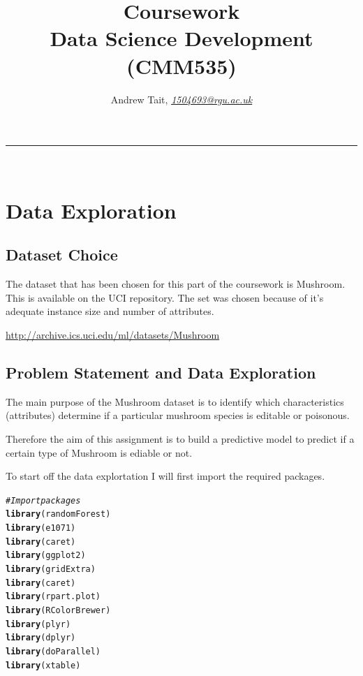 \documentclass[10pt  ,usenames, dvipsnames]{article}\usepackage[]{graphicx}\usepackage[]{color}
\makeatletter
\newcommand{\hlcom}[1]{\textcolor[rgb]{0.678,0.584,0.686}{\textit{#1}}}%
\newcommand{\hlstd}[1]{\textcolor[rgb]{0.345,0.345,0.345}{#1}}%
\newcommand{\hlkwd}[1]{\textcolor[rgb]{0.737,0.353,0.396}{\textbf{#1}}}%
\newenvironment{kframe}{%
 \def\at@end@of@kframe{}%
 \ifinner\ifhmode%
  \def\at@end@of@kframe{\end{minipage}}%
  \begin{minipage}{\columnwidth}%
 \fi\fi%
 \def\FrameCommand##1{\hskip\@totalleftmargin \hskip-\fboxsep
 \colorbox{shadecolor}{##1}\hskip-\fboxsep
     \hskip-\linewidth \hskip-\@totalleftmargin \hskip\columnwidth}%
 \MakeFramed {\advance\hsize-\width
   \@totalleftmargin\z@ \linewidth\hsize
   \@setminipage}}%
 {\par\unskip\endMakeFramed%
 \at@end@of@kframe}
\newenvironment{knitrout}{}{} %
\makeatother
\begin{document}
\title{\LARGE Coursework  \\ Data Science Development (CMM535)}

\author{Andrew Tait, \textit{\href{1504693@rgu.ac.uk}{1504693@rgu.ac.uk}}}
\maketitle
\noindent\rule{16cm}{0.4pt}
\ \\



\section {Data Exploration}



\subsection{Dataset Choice}
The dataset that has been chosen for this part of the coursework is Mushroom. This is available on the UCI repository. The set was chosen because of it's adequate instance size and number of attributes.

\url{http://archive.ics.uci.edu/ml/datasets/Mushroom}



\subsection{Problem Statement and Data Exploration}


The main purpose of the Mushroom dataset is to identify which characteristics (attributes) determine if a particular mushroom species is editable or poisonous.

Therefore the aim of this assignment is to build a predictive model to predict if a certain type of Mushroom is ediable or not.


To start off the data explortation I will first import the required packages.

\begin{knitrout}
\color{fgcolor}\begin{kframe}
\begin{alltt}
\hlcom{#Import packages}
\hlkwd{library}\hlstd{(randomForest)}
\hlkwd{library}\hlstd{(e1071)}
\hlkwd{library}\hlstd{(caret)}
\hlkwd{library}\hlstd{(ggplot2)}
\hlkwd{library}\hlstd{(gridExtra)}
\hlkwd{library}\hlstd{(caret)}
\hlkwd{library}\hlstd{(rpart.plot)}
\hlkwd{library}\hlstd{(RColorBrewer)}
\hlkwd{library}\hlstd{(plyr)}
\hlkwd{library}\hlstd{(dplyr)}
\hlkwd{library}\hlstd{(doParallel)}
\hlkwd{library}\hlstd{(xtable)}
\end{alltt}
\end{kframe}
\end{knitrout}
\end{document}
